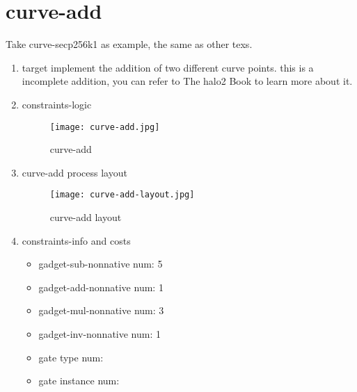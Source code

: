 \section{curve-add}
\label{curve-add}

Take curve-secp256k1 as example, the same as other texs.

\begin{enumerate}
    \item target
        implement the addition of two different curve points. this is a incomplete addition, you can refer to The halo2 Book \cite{website:halo2-book} to learn more about it.
    \item constraints-logic
        \begin{figure}[!ht]
            \centering
            \texttt{[image: curve-add.jpg]}
            \caption{curve-add}
            \label{fig:curve-add}
        \end{figure}
    \item curve-add process layout
        \begin{figure}[!ht]
            \centering
            \texttt{[image: curve-add-layout.jpg]}
            \caption{curve-add layout}
            \label{fig:curve-add-layout}
        \end{figure}
    
    \item constraints-info and costs
        \begin{itemize}
            \item gadget-sub-nonnative num: 5
            \item gadget-add-nonnative num: 1
            \item gadget-mul-nonnative num: 3
            \item gadget-inv-nonnative num: 1
            \item gate type num: 
            \item gate instance num: 
        \end{itemize}

\end{enumerate}